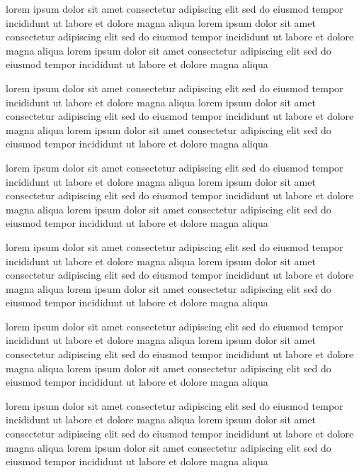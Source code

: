 \documentclass{article}
\begin{document}
lorem ipsum dolor sit amet consectetur adipiscing elit sed do eiusmod tempor incididunt ut labore et dolore magna aliqua lorem ipsum dolor sit amet consectetur adipiscing elit sed do eiusmod tempor incididunt ut labore et dolore magna aliqua lorem ipsum dolor sit amet consectetur adipiscing elit sed do eiusmod tempor incididunt ut labore et dolore magna aliqua

lorem ipsum dolor sit amet consectetur adipiscing elit sed do eiusmod tempor incididunt ut labore et dolore magna aliqua lorem ipsum dolor sit amet consectetur adipiscing elit sed do eiusmod tempor incididunt ut labore et dolore magna aliqua lorem ipsum dolor sit amet consectetur adipiscing elit sed do eiusmod tempor incididunt ut labore et dolore magna aliqua

lorem ipsum dolor sit amet consectetur adipiscing elit sed do eiusmod tempor incididunt ut labore et dolore magna aliqua lorem ipsum dolor sit amet consectetur adipiscing elit sed do eiusmod tempor incididunt ut labore et dolore magna aliqua lorem ipsum dolor sit amet consectetur adipiscing elit sed do eiusmod tempor incididunt ut labore et dolore magna aliqua

lorem ipsum dolor sit amet consectetur adipiscing elit sed do eiusmod tempor incididunt ut labore et dolore magna aliqua lorem ipsum dolor sit amet consectetur adipiscing elit sed do eiusmod tempor incididunt ut labore et dolore magna aliqua lorem ipsum dolor sit amet consectetur adipiscing elit sed do eiusmod tempor incididunt ut labore et dolore magna aliqua

lorem ipsum dolor sit amet consectetur adipiscing elit sed do eiusmod tempor incididunt ut labore et dolore magna aliqua lorem ipsum dolor sit amet consectetur adipiscing elit sed do eiusmod tempor incididunt ut labore et dolore magna aliqua lorem ipsum dolor sit amet consectetur adipiscing elit sed do eiusmod tempor incididunt ut labore et dolore magna aliqua

lorem ipsum dolor sit amet consectetur adipiscing elit sed do eiusmod tempor incididunt ut labore et dolore magna aliqua lorem ipsum dolor sit amet consectetur adipiscing elit sed do eiusmod tempor incididunt ut labore et dolore magna aliqua lorem ipsum dolor sit amet consectetur adipiscing elit sed do eiusmod tempor incididunt ut labore et dolore magna aliqua
\end{document}
